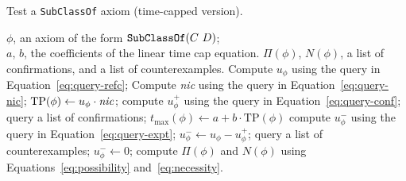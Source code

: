 \documentclass{sig-alternate}
\newcommand{\VAR}[1]{\leavevmode\hbox{\it #1\/}}
\begin{document}
\begin{algorithm}
\caption{Test a \texttt{SubClassOf} axiom\hfill\break
  (time-capped version).}\label{algo:time-capped-axiom-test}
\renewcommand{\algorithmicfor}{\textbf{waiting up to}}
\begin{algorithmic}[1]
  \REQUIRE $\phi$, an axiom of the form $\mbox{\tt SubClassOf}(C\ D)$;\\
    $a$, $b$, the coefficients of the linear time cap equation.
  \ENSURE $\Pi(\phi)$, $N(\phi)$, a list of confirmations, and a list of counterexamples.
  \STATE Compute $u_\phi$ using the query in Equation~\ref{eq:query-refc};
  \STATE Compute \VAR{nic} using the query in Equation~\ref{eq:query-nic};
  \STATE $\mathrm{TP}(\phi) \leftarrow u_\phi \cdot \VAR{nic}$;
  \STATE compute $u^+_\phi$ using the query in Equation~\ref{eq:query-conf};
    \STATE query a list of confirmations;
  \ENDIF
    \STATE $t_{\max}(\phi) \leftarrow a + b\cdot\mathrm{TP}(\phi)$
      \STATE compute $u^-_\phi$ using the query in Equation~\ref{eq:query-expt};
    \ENDFOR
      \STATE $u^-_\phi \leftarrow u_\phi - u^+_\phi$;
      \STATE query a list of counterexamples;
    \ENDIF
  \ELSE
    \STATE $u^-_\phi \leftarrow 0$;
  \ENDIF
  \STATE compute $\Pi(\phi)$ and $N(\phi)$ using Equations~\ref{eq:possibility} and~\ref{eq:necessity}.
\end{algorithmic}
\end{algorithm}

%
%

\end{document}
